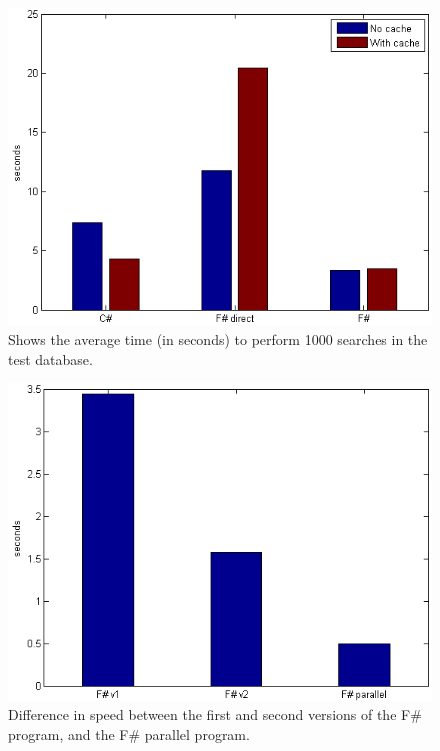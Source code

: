 \documentclass[12pt, a4paper]{article}
\begin{document}
\begin{figure}[!h]
    \includegraphics[scale=0.8]{averageChart1}
    \centering
    \caption{Shows the average time (in seconds) to perform 1000 searches in the test database.}
\label{fig:averageChart1}
\end{figure}

\begin{figure}[!h]
    \includegraphics[scale=0.8]{averageChart2}
    \centering
    \caption{Difference in speed between the first and second versions of the F\# program, and the F\# parallel program.}
\label{fig:averageChart2}
\end{figure}

\newpage
\end{document}
